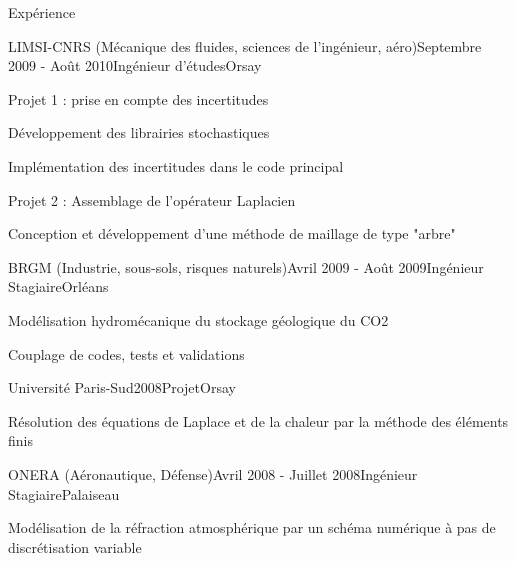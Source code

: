 \documentclass{resume} %
\begin{document}
\begin{rSection}{Expérience}

\begin{rSubsection}{LIMSI-CNRS (Mécanique des fluides, sciences de l'ingénieur, aéro)}{Septembre 2009 - Août 2010}{Ingénieur d'études}{Orsay}
\item Projet 1 : prise en compte des incertitudes
\item Développement des librairies stochastiques
\item Implémentation des incertitudes dans le code principal \smallskip
\item Projet 2 : Assemblage de l'opérateur Laplacien
\item Conception et développement d'une méthode de maillage de type "arbre"
\end{rSubsection}


\begin{rSubsection}{BRGM (Industrie, sous-sols, risques naturels)}{Avril 2009 - Août 2009}{Ingénieur Stagiaire}{Orléans}
\item Modélisation hydromécanique du stockage géologique du CO2
\item Couplage de codes, tests et validations
\end{rSubsection}


\begin{rSubsection}{Université Paris-Sud}{2008}{Projet}{Orsay}
\item Résolution des équations de Laplace et de la chaleur par la méthode des éléments finis
\end{rSubsection}


\begin{rSubsection}{ONERA (Aéronautique, Défense)}{Avril 2008 - Juillet 2008}{Ingénieur Stagiaire}{Palaiseau}
\item Modélisation de la réfraction atmosphérique par un schéma numérique à pas de discrétisation variable
\end{rSubsection}

\end{rSection}

\end{document}
